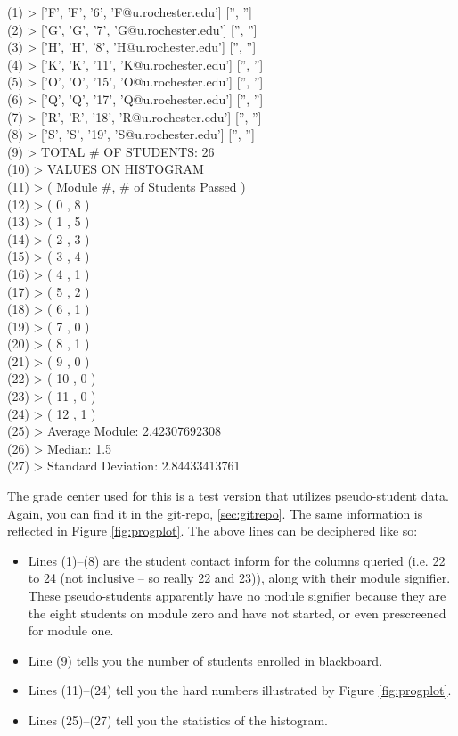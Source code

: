 \documentclass[12pt]{article}
\begin{document}
\begin{mdframed}[style=CommandFrame]
(1) > ['F', 'F', '6', 'F@u.rochester.edu'] ['', ''] \\
(2) > ['G', 'G', '7', 'G@u.rochester.edu'] ['', ''] \\
(3) > ['H', 'H', '8', 'H@u.rochester.edu'] ['', ''] \\
(4) > ['K', 'K', '11', 'K@u.rochester.edu'] ['', ''] \\
(5) > ['O', 'O', '15', 'O@u.rochester.edu'] ['', ''] \\
(6) > ['Q', 'Q', '17', 'Q@u.rochester.edu'] ['', ''] \\
(7) > ['R', 'R', '18', 'R@u.rochester.edu'] ['', ''] \\
(8) > ['S', 'S', '19', 'S@u.rochester.edu'] ['', ''] \\
(9) > TOTAL \# OF STUDENTS:  26 \\
(10) > VALUES ON HISTOGRAM \\
(11) > ( Module \#, \# of Students Passed ) \\
(12) > ( 0 , 8 ) \\
(13) > ( 1 , 5 ) \\
(14) > ( 2 , 3 ) \\
(15) > ( 3 , 4 ) \\
(16) > ( 4 , 1 ) \\
(17) > ( 5 , 2 ) \\
(18) > ( 6 , 1 ) \\
(19) > ( 7 , 0 ) \\
(20) > ( 8 , 1 ) \\
(21) > ( 9 , 0 ) \\
(22) > ( 10 , 0 ) \\
(23) > ( 11 , 0 ) \\
(24) > ( 12 , 1 ) \\
(25) > Average Module:  2.42307692308 \\
(26) > Median:  1.5 \\
(27) > Standard Deviation:  2.84433413761
\end{mdframed}

\indent The grade center used for this is a test version that utilizes pseudo-student data. Again, you can find it in the git-repo, \ref{sec:gitrepo}. The same information is reflected in Figure \ref{fig:progplot}. The above lines can be deciphered like so:

\begin{itemize}
	\item Lines (1)--(8) are the student contact inform for the columns queried (i.e. 22 to 24 (not inclusive -- so really 22 and 23)), along with their module signifier. These pseudo-students apparently have no module signifier because they are the eight students on module zero and have not started, or even prescreened for module one.
	\item Line (9) tells you the number of students enrolled in blackboard.
	\item Lines (11)--(24) tell you the hard numbers illustrated by Figure \ref{fig:progplot}.
	\item Lines (25)--(27) tell you the statistics of the histogram.
\end{itemize}
\end{document}
